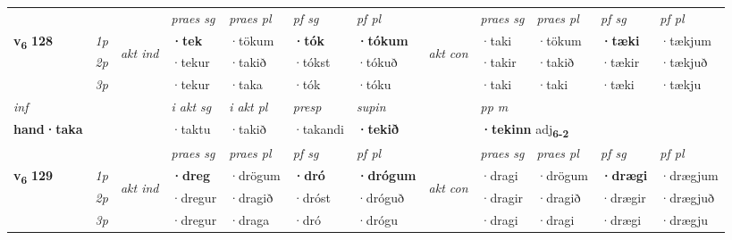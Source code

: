 \begin{longtable}[l]{X>{\footnotesize\itshape}llXXXXlXXXX}
 & &   & \textit{praes sg}  & \textit{praes pl}    & \textit{ pf sg} & \textit{pf pl} & & \textit{praes sg}  & \textit{praes pl}    & \textit{pf sg} & \textit{pf pl }  \\ \cmidrule{4-7} \cmidrule{9-12}
 \multirow{2}{*}{{{\textbf{v{\textsubscript{6}}} \Large{\textbf{128}}}}}  & 1p & \multirow{3}{*}{\begin{turn}{90}\textit{akt ind}\end{turn}} & \textbf{·tek} & ·tökum & \textbf{·tók} & \textbf{·tókum} & \multirow{3}{*}{\begin{turn}{90}\textit{akt con}\end{turn}} &·taki & ·tökum & \textbf{·tæki} & ·tækjum\\*
 & 2p &  &  ·tekur  & ·takið & ·tókst & ·tókuð & & ·takir & ·takið & ·tækir & ·tækjuð \\*
 & 3p &  & ·tekur & ·taka & ·tók & ·tóku & & ·taki & ·taki& ·tæki & ·tækju \\*
\cmidrule{4-7} \cmidrule{9-12}

   {\textit{inf}} & &  & \textit{i akt sg} & \textit{i akt pl}   & \textit{presp} & \textit{supin}  && \textit{pp m} \\*
  {\textbf{hand\allowbreak ·taka}} & && ·taktu  & ·takið   & ·takandi &  \textbf{·tekið}  && \multicolumn{2}{l}{\textbf{·tekinn} adj\textbf{\textsubscript{6-2}}} \\*

\midrule

 \midrule
 & &   & \textit{praes sg}  & \textit{praes pl}    & \textit{ pf sg} & \textit{pf pl} & & \textit{praes sg}  & \textit{praes pl}    & \textit{pf sg} & \textit{pf pl }  \\ \cmidrule{4-7} \cmidrule{9-12}
 \multirow{2}{*}{{{\textbf{v{\textsubscript{6}}} \Large{\textbf{129}}}}}  & 1p & \multirow{3}{*}{\begin{turn}{90}\textit{akt ind}\end{turn}} & \textbf{·dreg} & ·drögum & \textbf{·dró} & \textbf{·drógum} & \multirow{3}{*}{\begin{turn}{90}\textit{akt con}\end{turn}} &·dragi & ·drögum & \textbf{·drægi} & ·drægjum\\*
 & 2p &  &  ·dregur  & ·dragið & ·dróst & ·dróguð & & ·dragir & ·dragið & ·drægir & ·drægjuð \\*
 & 3p &  & ·dregur & ·draga & ·dró & ·drógu & & ·dragi & ·dragi& ·drægi & ·drægju \\*
\cmidrule{4-7} \cmidrule{9-12}


\end{longtable}

